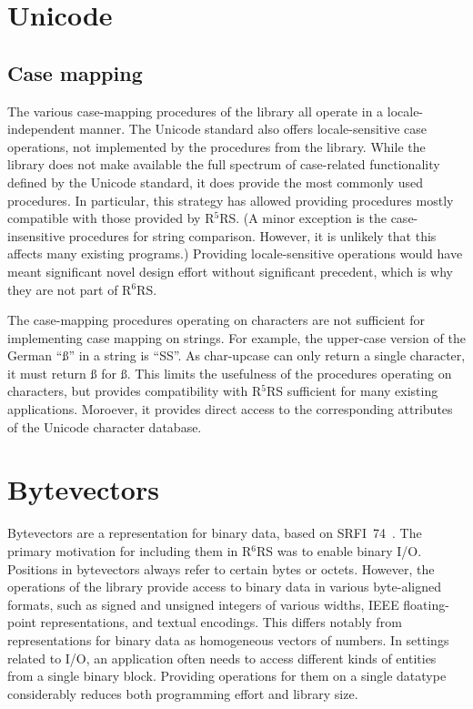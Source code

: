 \documentclass[twoside,twocolumn]{algol60}
\newcommand{\rn}[1]{R$^{#1}$RS}
\begin{document}
\chapter{Unicode}

\section{Case mapping}

The various case-mapping procedures of the 
library all operate in a locale-independent manner.  The Unicode
standard also offers locale-sensitive case operations, not implemented
by the procedures from the  library.  While the
library does not make available the full spectrum of case-related
functionality defined by the Unicode standard, it does provide the
most commonly used procedures.  In particular, this strategy has
allowed providing procedures mostly compatible with those provided by
\rn{5}.  (A minor exception is the case-insensitive procedures for
string comparison.  However, it is unlikely that this affects many
existing programs.)  Providing locale-sensitive operations would have
meant significant novel design effort without significant precedent,
which is why they are not part of \rn{6}.

The case-mapping procedures operating on characters are not sufficient
for implementing case mapping on strings.  For example, the upper-case
version of the German ``\ss{}'' in a string is ``SS''.  As {\cf
  char-upcase} can only return a single character, it must return
\ss{} for \ss.  This limits the usefulness of the procedures
operating on characters, but provides compatibility with \rn{5}
sufficient for many existing applications.  Moroever, it provides
direct access to the corresponding attributes of the Unicode character
database.

\chapter{Bytevectors}

Bytevectors are a representation for binary data, based on
SRFI~74~\cite{srfi74}.  The primary motivation for including them in
\rn{6} was to enable binary I/O.  Positions in bytevectors always
refer to certain bytes or octets.  However, the operations of the
 library provide access to binary data in
various byte-aligned formats, such as signed and unsigned integers of
various widths, IEEE floating-point representations, and textual
encodings.  This differs notably from representations for binary data
as homogeneous vectors of numbers.  In settings related to I/O, an
application often needs to access different kinds of entities from a
single binary block.  Providing operations for them on a single
datatype considerably reduces both programming effort and library
size.
\end{document}
